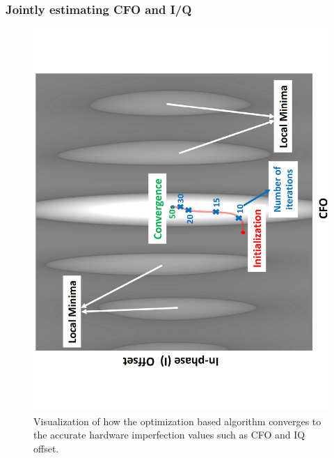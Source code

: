 \subsubsection{Jointly estimating CFO and I/Q}
\begin{figure}[t!]
    \centering
    \includegraphics[angle = 270, width = \linewidth]{plots/heatmap.pdf} 
    \caption{Visualization of how the optimization based algorithm converges to the accurate hardware imperfection values such as CFO and IQ offset.}
    \label{fig:heatmap}
\end{figure}
